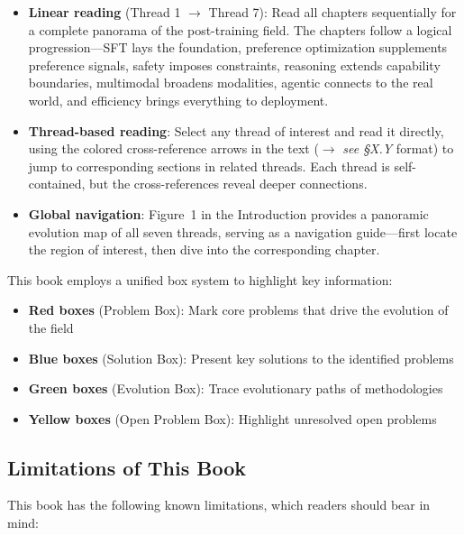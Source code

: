 \begin{itemize}[leftmargin=2em]
  \item \textbf{Linear reading} (Thread 1 $\rightarrow$ Thread 7):
    Read all chapters sequentially for a complete panorama of the post-training field.
    The chapters follow a logical progression---SFT lays the foundation, preference optimization supplements preference signals,
    safety imposes constraints, reasoning extends capability boundaries, multimodal broadens modalities,
    agentic connects to the real world, and efficiency brings everything to deployment.

  \item \textbf{Thread-based reading}:
    Select any thread of interest and read it directly,
    using the colored cross-reference arrows in the text ({\color{thread2}$\rightarrow$} \textit{see \S X.Y} format) to jump to corresponding sections in related threads.
    Each thread is self-contained, but the cross-references reveal deeper connections.

  \item \textbf{Global navigation}:
    Figure~1 in the Introduction provides a panoramic evolution map of all seven threads,
    serving as a navigation guide---first locate the region of interest, then dive into the corresponding chapter.
\end{itemize}

\noindent
This book employs a unified box system to highlight key information:
\begin{itemize}[leftmargin=2em]
  \item \textbf{\color{red!60}Red boxes} (Problem Box): Mark core problems that drive the evolution of the field
  \item \textbf{\color{blue!60}Blue boxes} (Solution Box): Present key solutions to the identified problems
  \item \textbf{\color{green!60!black}Green boxes} (Evolution Box): Trace evolutionary paths of methodologies
  \item \textbf{\color{yellow!70!black}Yellow boxes} (Open Problem Box): Highlight unresolved open problems
\end{itemize}

\subsection*{Limitations of This Book}

This book has the following known limitations, which readers should bear in mind:

